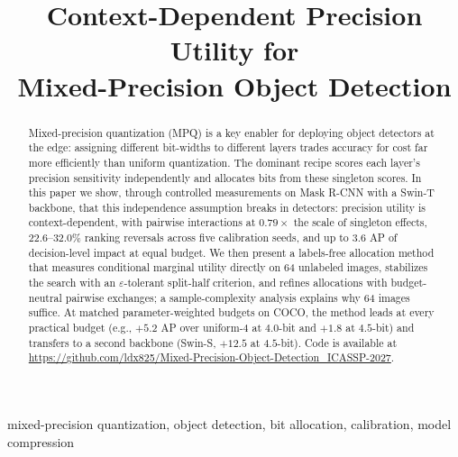 \documentclass{article}
\title{Context-Dependent Precision Utility for\\ Mixed-Precision Object Detection}
\begin{document}
\maketitle
\vspace{-0.75em}

\begin{abstract}
Mixed-precision quantization (MPQ) is a key enabler for deploying object
detectors at the edge: assigning different bit-widths to different layers
trades accuracy for cost far more efficiently than uniform quantization.
The dominant recipe scores each layer's precision sensitivity
independently and allocates bits from these singleton scores. In this
paper we show, through controlled measurements on Mask R-CNN with a
Swin-T backbone, that this independence assumption breaks in detectors:
precision utility is context-dependent, with pairwise interactions at
$0.79\times$ the scale of singleton effects, $22.6$--$32.0\%$ ranking
reversals across five calibration seeds, and up to $3.6$ AP of
decision-level impact at equal budget. We then present a labels-free
allocation method that measures conditional marginal utility directly on
64 unlabeled images, stabilizes the search with an $\varepsilon$-tolerant
split-half criterion, and refines allocations with budget-neutral
pairwise exchanges; a sample-complexity analysis explains why 64 images
suffice. At matched parameter-weighted budgets on COCO, the method leads
at every practical budget (e.g., $+5.2$ AP over uniform-4 at $4.0$-bit
and $+1.8$ at $4.5$-bit) and transfers to a second backbone (Swin-S,
$+12.5$ at $4.5$-bit).
Code is available at \url{https://github.com/ldx825/Mixed-Precision-Object-Detection_ICASSP-2027}.
\end{abstract}

\begin{keywords}
mixed-precision quantization, object detection, bit allocation,
calibration, model compression
\end{keywords}









\end{document}
